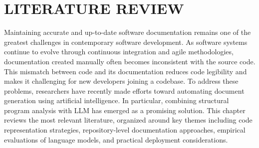 \chapter{LITERATURE REVIEW}
\hspace{0.5cm}
Maintaining accurate and up-to-date software documentation remains one of the greatest challenges in contemporary software development. As software systems continue to evolve through continuous integration and agile methodologies, documentation created manually often becomes inconsistent with the source code. This mismatch between code and its documentation reduces code legibility and makes it challenging for new developers joining a codebase. To address these problems, researchers have recently made efforts toward automating document generation using artificial intelligence. In particular, combining structural program analysis with LLM has emerged as a promising solution. This chapter reviews the most relevant literature, organized around key themes including code representation strategies, repository-level documentation approaches, empirical evaluations of language models, and practical deployment considerations.

